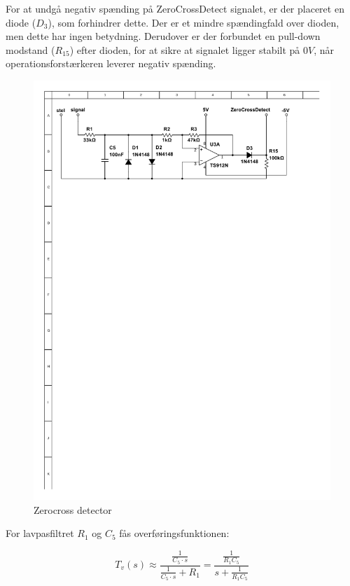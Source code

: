 For at undgå negativ spænding på ZeroCrossDetect signalet, er der placeret en diode ($D_{3}$), som forhindrer dette. Der er et mindre spændingfald over dioden, men dette har ingen betydning. Derudover er der forbundet en pull-down modstand ($R_{15}$) efter dioden, for at sikre at signalet ligger stabilt på $0V$, når operationsforstærkeren leverer negativ spænding.
\begin{figure}[h]
	\centering
	\includegraphics[scale=1, trim=45 635 80 50, clip=true]{../HardwareDesign/Diagrammer/ZeroCrossDetector.pdf}
	\caption{Zerocross detector}
	\label{fig:ZeroCrossDetect}
\end{figure}

For lavpasfiltret $R_{1}$ og $C_{5}$ fås overføringsfunktionen:

\begin{displaymath}
T_{v}(s) \approx \dfrac{\tfrac{1}{C_{5} \cdot s}}{\tfrac{1}{C_{5} \cdot s} + R_{1}} =
\dfrac{\tfrac{1}{R_{1}C_{5}}}{s+\tfrac{1}{R_{1}C_{5}}}
\end{displaymath}

